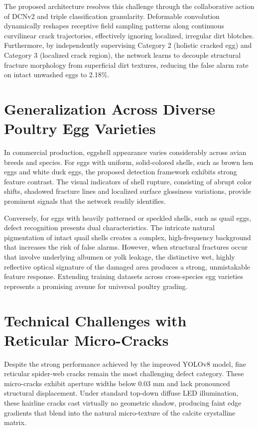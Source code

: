 \documentclass[12pt,a4paper]{report}
\begin{document}
The proposed architecture resolves this challenge through the collaborative action of DCNv2 and triple classification granularity. Deformable convolution dynamically reshapes receptive field sampling patterns along continuous curvilinear crack trajectories, effectively ignoring localized, irregular dirt blotches. Furthermore, by independently supervising Category 2 (holistic cracked egg) and Category 3 (localized crack region), the network learns to decouple structural fracture morphology from superficial dirt textures, reducing the false alarm rate on intact unwashed eggs to 2.18\%.

\section{Generalization Across Diverse Poultry Egg Varieties}

In commercial production, eggshell appearance varies considerably across avian breeds and species. For eggs with uniform, solid-colored shells, such as brown hen eggs and white duck eggs, the proposed detection framework exhibits strong feature contrast. The visual indicators of shell rupture, consisting of abrupt color shifts, shadowed fracture lines and localized surface glossiness variations, provide prominent signals that the network readily identifies.

Conversely, for eggs with heavily patterned or speckled shells, such as quail eggs, defect recognition presents dual characteristics. The intricate natural pigmentation of intact quail shells creates a complex, high-frequency background that increases the risk of false alarms. However, when structural fractures occur that involve underlying albumen or yolk leakage, the distinctive wet, highly reflective optical signature of the damaged area produces a strong, unmistakable feature response. Extending training datasets across cross-species egg varieties represents a promising avenue for universal poultry grading.

\section{Technical Challenges with Reticular Micro-Cracks}

Despite the strong performance achieved by the improved YOLOv8 model, fine reticular spider-web cracks remain the most challenging defect category. These micro-cracks exhibit aperture widths below 0.03 mm and lack pronounced structural displacement. Under standard top-down diffuse LED illumination, these hairline cracks cast virtually no geometric shadow, producing faint edge gradients that blend into the natural micro-texture of the calcite crystalline matrix.
\end{document}
